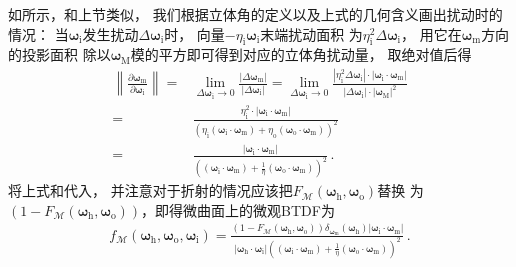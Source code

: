 如所示，和上节类似，
我们根据立体角的定义以及上式的几何含义画出扰动时的情况：
当${\bm\omega}_{\mathrm{i}}$发生扰动$\Delta{\bm\omega}_{\mathrm{i}}$时，
向量$-\eta_{\mathrm{i}}{\bm\omega}_{\mathrm{i}}$末端扰动面积
为$\eta^2_{\mathrm{i}}\Delta{\bm\omega}_{\mathrm{i}}$，
用它在${\bm\omega}_{\mathrm{m}}$方向的投影面积
除以${\bm\omega}_{\mathrm{M}}$模的平方即可得到对应的立体角扰动量，
取绝对值后得
\begin{align}
    \left\lVert\frac{\partial{\bm\omega}_{\mathrm{m}}}{\partial{\bm\omega}_{\mathrm{i}}}\right\rVert
    =&\lim\limits_{\Delta{\bm\omega}_{\mathrm{i}}\to0}\frac{|\Delta{\bm\omega}_{\mathrm{m}}|}{|\Delta{\bm\omega}_{\mathrm{i}}|}
    =\lim\limits_{\Delta{\bm\omega}_{\mathrm{i}}\to0}\frac{|\eta^2_{\mathrm{i}}\Delta{\bm\omega}_{\mathrm{i}}|
    \cdot|{\bm\omega}_{\mathrm{i}}\cdot{\bm\omega}_{\mathrm{m}}|}
    {|\Delta{\bm\omega}_{\mathrm{i}}|\cdot|{\bm\omega}_{\mathrm{M}}|^2}\nonumber\\
    =&\frac{\eta^2_{\mathrm{i}}\cdot|{\bm\omega}_{\mathrm{i}}\cdot{\bm\omega}_{\mathrm{m}}|}
    {(\eta_{\mathrm{i}}({\bm\omega}_{\mathrm{i}}\cdot{\bm\omega}_{\mathrm{m}})
    +\eta_{\mathrm{o}}({\bm\omega}_{\mathrm{o}}\cdot{\bm\omega}_{\mathrm{m}}))^2}\nonumber\\
    =&\frac{|{\bm\omega}_{\mathrm{i}}\cdot{\bm\omega}_{\mathrm{m}}|}
    {\displaystyle(({\bm\omega}_{\mathrm{i}}\cdot{\bm\omega}_{\mathrm{m}})
    +\frac{1}{\eta}({\bm\omega}_{\mathrm{o}}\cdot{\bm\omega}_{\mathrm{m}}))^2}\, .
\end{align}
将上式和代入，
并注意对于折射的情况应该把$F_{\mathcal{M}}({\bm\omega}_{\mathrm{h}},{\bm\omega}_{\mathrm{o}})$替换
为$(1-F_{\mathcal{M}}({\bm\omega}_{\mathrm{h}},{\bm\omega}_{\mathrm{o}}))$，即得微曲面上的微观BTDF为
\begin{align}
    f_{\mathcal{M}}({\bm\omega}_{\mathrm{h}},{\bm\omega}_{\mathrm{o}},{\bm\omega}_{\mathrm{i}})
    =\frac{(1-F_{\mathcal{M}}({\bm\omega}_{\mathrm{h}},{\bm\omega}_{\mathrm{o}}))
    \delta_{{\bm\omega}_{\mathrm{m}}}({\bm\omega}_{\mathrm{h}})
    |{\bm\omega}_{\mathrm{i}}\cdot{\bm\omega}_{\mathrm{m}}|}
    {|{\bm\omega}_{\mathrm{h}}\cdot{\bm\omega}_{\mathrm{i}}|
    \displaystyle(({\bm\omega}_{\mathrm{i}}\cdot{\bm\omega}_{\mathrm{m}})
    +\frac{1}{\eta}({\bm\omega}_{\mathrm{o}}\cdot{\bm\omega}_{\mathrm{m}}))^2}\, .
\end{align}

